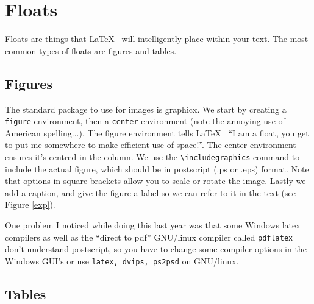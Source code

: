 \documentclass[twocolumn,10 pt,showpacs,preprintnumbers,amsmath,amssymb]{revtex4-1}%
\begin{document}
\section*{Floats}

Floats are things that \LaTeX~ will intelligently place within your text.  
The most common types of floats are figures and tables.

\subsection{Figures}

The standard package to use for images is graphicx. We start by creating a
\verb_figure_ environment, then a \verb_center_ environment (note the annoying
use of American spelling...). The figure environment tells \LaTeX~ ``I am a
float, you get to put me somewhere to make efficient use of space!''. The
center environment ensures it's centred in the column. We use the
\verb_\includegraphics_ command to include the actual figure, which should be
in postscript (.ps or .eps) format. Note that options in square brackets allow
you to scale or rotate the image. Lastly we add a caption, and give the figure
a label so we can refer to it in the text (see Figure \ref{exp}).

One problem I noticed while doing this last year was that some Windows latex
compilers as well as the ``direct to pdf'' GNU/linux compiler called \verb_pdflatex_
don't understand postscript, so you have to change some compiler options in
the Windows GUI's or use \verb_latex, dvips, ps2psd_ on GNU/linux.

\subsection{Tables}
\end{document}
